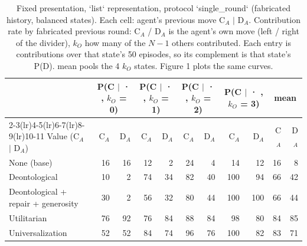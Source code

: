 \begin{table}[t]
\centering
\caption{Fixed presentation, `list` representation, protocol `single_round` (fabricated history, balanced states). Each cell: agent's previous move C$_A$ $\mid$ D$_A$. Contribution rate by fabricated previous round: C$_A$ / D$_A$ is the agent's own move (left / right of the divider), $k_O$ how many of the $N-1$ others contributed. Each entry is contributions over that state's 50 episodes, so its complement is that state's P(D). mean pools the 4 $k_O$ states. Figure 1 plots the same curves.}
\label{tab:contribution}
\small
\setlength{\tabcolsep}{3.5pt}
\begin{tabular}{lrrrrrrrrrr}
\toprule
 & \multicolumn{2}{c}{P(C $\mid$ · , $k_O$ = 0)} & \multicolumn{2}{c}{P(C $\mid$ · , $k_O$ = 1)} & \multicolumn{2}{c}{P(C $\mid$ · , $k_O$ = 2)} & \multicolumn{2}{c}{P(C $\mid$ · , $k_O$ = 3)} & \multicolumn{2}{c}{mean} \\
\cmidrule(lr){2-3}\cmidrule(lr){4-5}\cmidrule(lr){6-7}\cmidrule(lr){8-9}\cmidrule(lr){10-11}
Value (C$_A$ $\mid$ D$_A$) & C$_A$ & D$_A$ & C$_A$ & D$_A$ & C$_A$ & D$_A$ & C$_A$ & D$_A$ & C$_A$ & D$_A$ \\
\midrule
None (base) & 16 & 16 & 12 & 2 & 24 & 4 & 14 & 12 & 16 & 8 \\
Deontological & 10 & 2 & 74 & 34 & 82 & 40 & 100 & 94 & 66 & 42 \\
Deontological + repair + generosity & 30 & 2 & 56 & 32 & 80 & 44 & 100 & 100 & 66 & 44 \\
Utilitarian & 76 & 92 & 76 & 84 & 88 & 84 & 98 & 80 & 84 & 85 \\
Universalization & 52 & 52 & 84 & 74 & 96 & 76 & 100 & 82 & 83 & 71 \\
\bottomrule
\end{tabular}
\end{table}
